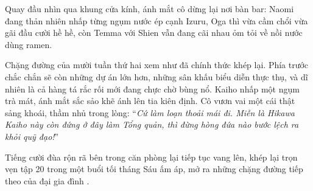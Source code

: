 \documentclass[../main.tex]{subfiles}
\begin{document}
Quay đầu nhìn qua khung cửa kính, ánh mắt cô dừng lại nơi bàn bar: Naomi đang thản nhiên nhấp từng ngụm nước ép cạnh Izuru, Oga thì vừa cầm chổi vừa gãi đầu cười hề hề, còn Temma với Shien vẫn đang cãi nhau ỏm tỏi về nồi nước dùng ramen.

Chặng đường của mười tuần thứ hai xem như đã chính thức khép lại. Phía trước chắc chắn sẽ còn những dự án lớn hơn, những sân khấu biểu diễn thực thụ, và dĩ nhiên là cả hàng tá rắc rối mới đang chực chờ bùng nổ. Kaiho nhấp một ngụm trà mát, ánh mắt sắc sảo khẽ ánh lên tia kiên định. Cô vươn vai một cái thật sảng khoái, thầm nhủ trong lòng: ``\textit{Cứ làm loạn thoải mái đi. Miễn là Hikawa Kaiho này còn đứng ở đây làm Tổng quản, thì đừng hòng đứa nào bước lệch ra khỏi quỹ đạo!}''

Tiếng cười đùa rộn rã bên trong căn phòng lại tiếp tục vang lên, khép lại trọn vẹn tập 20 trong một buổi tối tháng Sáu ấm áp, mở ra những chặng đường tiếp theo của đại gia đình \hls.
\end{document}
